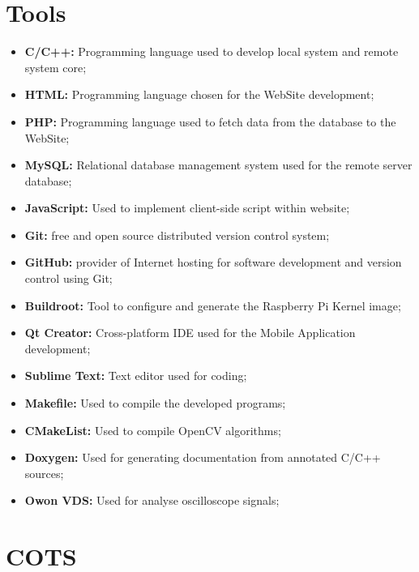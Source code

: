 \clearpage
\section{Tools}

\begin{itemize}
	\item \textbf{C/C++:} Programming language used to develop local system and remote system core;
	\item \textbf{HTML:} Programming language chosen for the WebSite development;
	\item \textbf{PHP:} Programming language used to fetch data from the database to the WebSite;
	\item \textbf{MySQL:} Relational database management system used for the remote server database;
	\item \textbf{JavaScript:} Used to implement client-side script within website;
	\item \textbf{Git:} free and open source distributed version control system;
	\item \textbf{GitHub:} provider of Internet hosting for software development and version control using Git;
	\item \textbf{Buildroot:} Tool to configure and generate the Raspberry Pi Kernel image;
	
	\item \textbf{Qt Creator:} Cross-platform IDE used for the Mobile Application development;
	\item \textbf{Sublime Text:} Text editor used for coding;
			
	\item \textbf{Makefile:} Used to compile the developed programs;
	\item \textbf{CMakeList:} Used to compile OpenCV algorithms;

	\item \textbf{Doxygen:} Used for generating documentation from annotated C/C++ sources;
	\item \textbf{Owon VDS:} Used for analyse oscilloscope signals;
\end{itemize}

\section{COTS}

